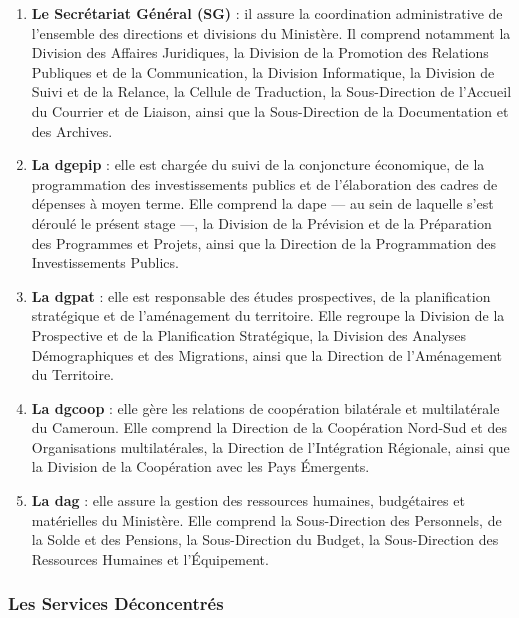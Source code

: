 \documentclass[12pt, a4paper, oneside]{report}
\begin{document}
\begin{enumerate}
  \item \textbf{Le Secrétariat Général (SG)} : il assure la coordination administrative de l'ensemble des directions et divisions du Ministère. Il comprend notamment la Division des Affaires Juridiques, la Division de la Promotion des Relations Publiques et de la Communication, la Division Informatique, la Division de Suivi et de la Relance, la Cellule de Traduction, la Sous-Direction de l'Accueil du Courrier et de Liaison, ainsi que la Sous-Direction de la Documentation et des Archives.

  \item \textbf{La \gls{dgepip}} : elle est chargée du suivi de la conjoncture économique, de la programmation des investissements publics et de l'élaboration des cadres de dépenses à moyen terme. Elle comprend la \gls{dape} --- au sein de laquelle s'est déroulé le présent stage ---, la Division de la Prévision et de la Préparation des Programmes et Projets, ainsi que la Direction de la Programmation des Investissements Publics.

  \item \textbf{La \gls{dgpat}} : elle est responsable des études prospectives, de la planification stratégique et de l'aménagement du territoire. Elle regroupe la Division de la Prospective et de la Planification Stratégique, la Division des Analyses Démographiques et des Migrations, ainsi que la Direction de l'Aménagement du Territoire.

  \item \textbf{La \gls{dgcoop}} : elle gère les relations de coopération bilatérale et multilatérale du Cameroun. Elle comprend la Direction de la Coopération Nord-Sud et des Organisations multilatérales, la Direction de l'Intégration Régionale, ainsi que la Division de la Coopération avec les Pays Émergents.

  \item \textbf{La \gls{dag}} : elle assure la gestion des ressources humaines, budgétaires et matérielles du Ministère. Elle comprend la Sous-Direction des Personnels, de la Solde et des Pensions, la Sous-Direction du Budget, la Sous-Direction des Ressources Humaines et l'Équipement.
\end{enumerate}

\subsubsection{Les Services Déconcentrés}
\end{document}
